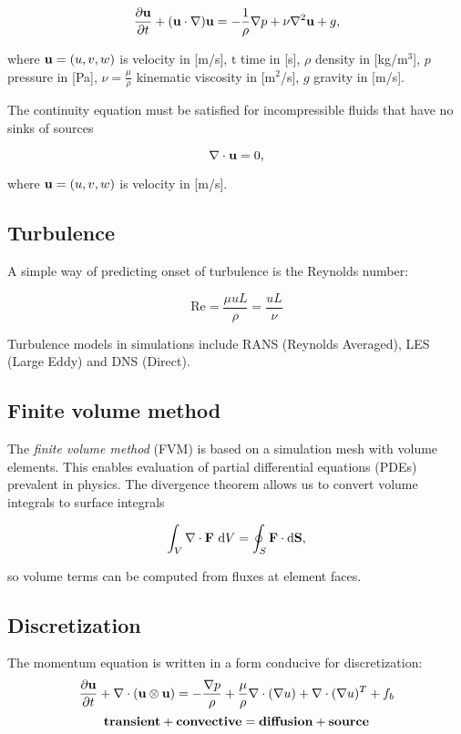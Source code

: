 \documentclass[12pt]{article}
\newcommand{\D}{\text{d}}
\newcommand{\vb}[1]{\text{\textbf{#1}}}
\begin{document}
\begin{equation}
  \frac{\partial \vb u}{\partial t} + (\vb u \cdot \nabla) \vb u = -\frac{1}{\rho} \nabla p + \nu \nabla^2 \vb u + g,
\end{equation}

where $\vb u = (u, v, w)$ is velocity in [m/s], t time in [s], $\rho$ density in [kg/m$^3$], $p$ pressure in [Pa], $\nu=\frac{\mu}{\rho}$ kinematic viscosity in [m$^2$/s], $g$ gravity in [m/s].

The continuity equation must be satisfied for incompressible fluids that have no sinks of sources

\begin{equation}
  \nabla \cdot \vb u = 0,
\end{equation}

where $\vb u = (u, v, w)$ is velocity in [m/s].

\subsection{Turbulence}

\noindent

A simple way of predicting onset of turbulence is the Reynolds number:

$$
\text{Re} = \frac{\mu u L}{\rho} = \frac{u L}{\nu}
$$

Turbulence models in simulations include RANS (Reynolds Averaged), LES (Large Eddy) and DNS (Direct).

\subsection{Finite volume method}

The \textit{finite volume method} (FVM) is based on a simulation mesh with volume elements. This enables evaluation of partial differential equations (PDEs) prevalent in physics. The divergence theorem allows us to convert volume integrals to surface integrals

$$
\int_V \nabla \cdot \vb F \ \D V = \oint_S \vb F \cdot \D \vb S,
$$

\noindent
so volume terms can be computed from fluxes at element faces.

\subsection{Discretization}

\noindent

The momentum equation is written in a form conducive for discretization:
$$
\frac{\partial \vb u}{\partial t} + \nabla \cdot (\vb u \otimes \vb u) = - \frac{\nabla p}{\rho} + \frac{\mu}{\rho} \nabla \cdot (\nabla u) + \nabla \cdot (\nabla u)^T + f_b
$$
$$
\vb{transient} + \vb{convective} =  \vb{diffusion} + \vb{source}
$$
\end{document}
